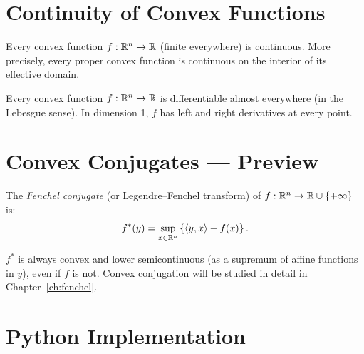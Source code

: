 \section{Continuity of Convex Functions}

\begin{theorem}[Continuity]
\label{thm:continuity}
Every convex function $f : \mathbb{R}^n \to \mathbb{R}$ (finite everywhere) is continuous. More
precisely, every proper convex function is continuous on the interior of its effective
domain.
\end{theorem}

\begin{theorem}
Every convex function $f : \mathbb{R}^n \to \mathbb{R}$ is differentiable almost everywhere (in the
Lebesgue sense). In dimension 1, $f$ has left and right derivatives at every point.
\end{theorem}

\section{Convex Conjugates --- Preview}

\begin{definition}
The \emph{Fenchel conjugate} (or Legendre--Fenchel transform) of
$f : \mathbb{R}^n \to \mathbb{R} \cup \{+\infty\}$ is:
\[
    f^*(y) = \sup_{x \in \mathbb{R}^n} \left\{\langle y, x \rangle - f(x)\right\}.
\]
\end{definition}

\begin{remark}
$f^*$ is always convex and lower semicontinuous (as a supremum of affine functions
in $y$), even if $f$ is not. Convex conjugation will be studied in detail in
Chapter~\ref{ch:fenchel}.
\end{remark}

\section{Python Implementation}

